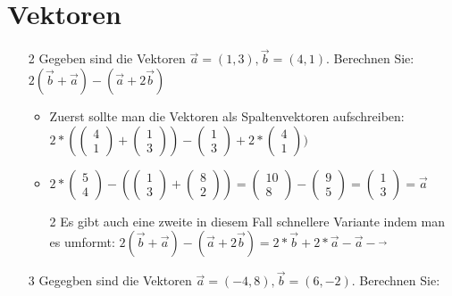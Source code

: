 \documentclass{article}
\begin{document}
	\section{Vektoren}
	\begin{itemize}
		\item[2]{Gegeben sind die Vektoren $\vec{a}=(1,3), \vec{b}=(4,1)$. Berechnen Sie: $2(\vec{b}+\vec{a})-(\vec{a}+2\vec{b})$}
		\begin{itemize}
			\item{Zuerst sollte man die Vektoren als Spaltenvektoren aufschreiben: $2*(\begin{pmatrix} 4 \\ 1 \end{pmatrix}+\begin{pmatrix} 1 \\ 3 \end{pmatrix})-\begin{pmatrix} 1 \\ 3 \end{pmatrix}+2*\begin{pmatrix} 4 \\ 1 \end{pmatrix})$}
			\item{$2*\begin{pmatrix} 5 \\ 4 \end{pmatrix}-(\begin{pmatrix} 1 \\ 3 \end{pmatrix}+\begin{pmatrix} 8 \\ 2 \end{pmatrix})=\begin{pmatrix} 10 \\ 8 \end{pmatrix}-\begin{pmatrix} 9 \\ 5 \end{pmatrix}=\begin{pmatrix} 1 \\ 3 \end{pmatrix}=\vec{a}$}
			\item[2]{Es gibt auch eine zweite in diesem Fall schnellere Variante indem man es umformt: $2(\vec{b}+\vec{a})-(\vec{a}+2 \vec{b})=2*\vec{b}+2*\vec{a}-\vec{a}-\vec{}$}
		\end{itemize}
		\item[3]{Gegegben sind die Vektoren $\vec{a}=(-4,8), \vec{b}=(6, -2)$. Berechnen Sie:}

\end{itemize}
\end{document}
